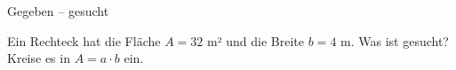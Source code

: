 \setcounter{aufgabe}{9}

\begin{aufgabe}{Gegeben – gesucht}
\begin{teile}
\teil Ein Rechteck hat die Fläche $A = 32$ m² und die Breite $b = 4$ m. Was ist gesucht? Kreise es in $A = a \cdot b$ ein.
\end{teile}
\end{aufgabe}

